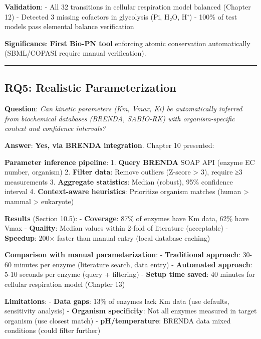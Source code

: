 \textbf{Validation}: - All 32 transitions in cellular respiration model
balanced (Chapter 12) - Detected 3 missing cofactors in glycolysis (Pi,
H₂O, H⁺) - 100\% of test models pass elemental balance verification

\textbf{Significance}: \textbf{First Bio-PN tool} enforcing atomic
conservation automatically (SBML/COPASI require manual verification).

\begin{center}\rule{0.5\linewidth}{0.5pt}\end{center}

\hypertarget{rq5-realistic-parameterization}{%
\subsection{RQ5: Realistic
Parameterization}\label{rq5-realistic-parameterization}}

\textbf{Question}: \emph{Can kinetic parameters (Km, Vmax, Ki) be
automatically inferred from biochemical databases (BRENDA, SABIO-RK)
with organism-specific context and confidence intervals?}

\textbf{Answer}: \textbf{Yes, via BRENDA integration}. Chapter 10
presented:

\textbf{Parameter inference pipeline}: 1. \textbf{Query BRENDA} SOAP API
(enzyme EC number, organism) 2. \textbf{Filter data}: Remove outliers
(Z-score \textgreater{} 3), require ≥3 measurements 3. \textbf{Aggregate
statistics}: Median (robust), 95\% confidence interval 4.
\textbf{Context-aware heuristics}: Prioritize organism matches (human
\textgreater{} mammal \textgreater{} eukaryote)

\textbf{Results} (Section 10.5): - \textbf{Coverage}: 87\% of enzymes
have Km data, 62\% have Vmax - \textbf{Quality}: Median values within
2-fold of literature (acceptable) - \textbf{Speedup}: 200× faster than
manual entry (local database caching)

\textbf{Comparison with manual parameterization}: - \textbf{Traditional
approach}: 30-60 minutes per enzyme (literature search, data entry) -
\textbf{Automated approach}: 5-10 seconds per enzyme (query + filtering)
- \textbf{Setup time saved}: 40 minutes for cellular respiration model
(Chapter 13)

\textbf{Limitations}: - \textbf{Data gaps}: 13\% of enzymes lack Km data
(use defaults, sensitivity analysis) - \textbf{Organism specificity}:
Not all enzymes measured in target organism (use closest match) -
\textbf{pH/temperature}: BRENDA data mixed conditions (could filter
further)

